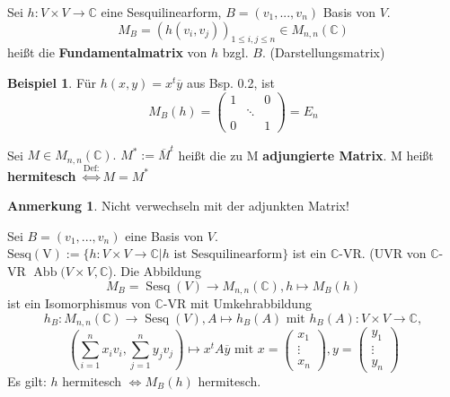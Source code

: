 \documentclass[a4paper, titlepage]{article}
\theoremstyle{definition}
\newtheorem{bsp}[satz]{Beispiel}
\newtheorem*{anm}{Anmerkung}
\newcommand{\C}{\mathbb{C}}
\begin{document}
\begin{definition}
	Sei $h: V\times V \longrightarrow \C $ eine Sesquilinearform, $B = (v_1,...,v_n)$ Basis von $V$.
	$$M_B = (h(v_i,v_j))_{1 \leq i,j \leq n} \in M_{n,n}(\C)$$ heißt die \textbf{Fundamentalmatrix} von $h$ bzgl. $B$. (Darstellungsmatrix)
\end{definition}
\begin{bsp}
	Für $h(x,y) = x^t\overline{y}$ aus Bsp. 0.2, ist $$M_B(h)=\left(\begin{matrix}
	{1}&{}&{0 }\\
	{  }&{\ddots}&{  }\\
	{ 0 }&{}&{ 1 }
	\end{matrix}\right) = E_n
	 $$
\end{bsp}
\begin{definition}
Sei $M \in M_{n,n}(\C).$ $M^{*} := \overline{M}^t$ heißt die zu M \textbf{adjungierte Matrix}. M heißt \textbf{hermitesch} $\overset{\text{Def:}}{\Leftrightarrow}M = M^{*}$\\
\end{definition}
\begin{anm}
     Nicht verwechseln mit der adjunkten Matrix!
\end{anm}    
\begin{satz}
	Sei $B = (v_1,...,v_n)$ eine Basis von $V$.\\ $\operatorname{Sesq(V)} := \{ h: V \times V \longrightarrow \C  | h\text{ ist Sesquilinearform} \}$ ist ein $\C$-VR. (UVR von $\C$-VR $\operatorname{Abb}(V\times V, \C$). Die Abbildung $$M_B = \operatorname{Sesq}(V) \longrightarrow M_{n,n}(\C), h \mapsto M_B(h)$$ ist ein Isomorphismus von $\C$-VR mit Umkehrabbildung $$h_B: M_{n,n}(\C) \longrightarrow \operatorname{Sesq}(V), A \mapsto h_B(A) \text{ mit } h_B(A): V \times V \longrightarrow\C, $$ $$\left(\sum_{i=1}^{n}x_iv_i,
	 \sum_{j=1}^{n}y_jv_j\right)\mapsto x^tA\overline{y} \text{ mit }  x = \begin{pmatrix} x_1 \\ \vdots \\ x_n \end{pmatrix}, y = \begin{pmatrix} y_1 \\ \vdots \\ y_n \end{pmatrix}$$
	 Es gilt: $h$ hermitesch $\Leftrightarrow M_B(h)$ hermitesch.
	 \end{satz}
\end{document}
